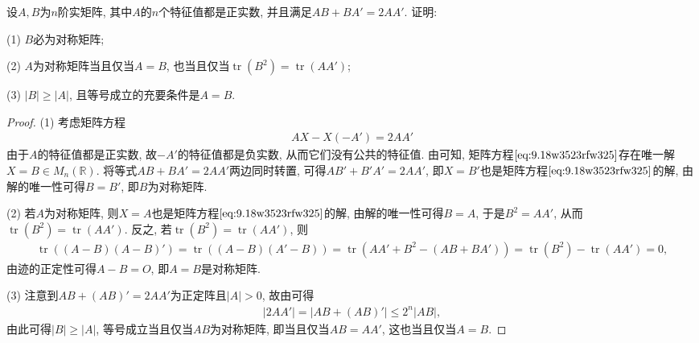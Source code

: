 \documentclass[../../main.tex]{subfiles}%
\begin{document}
\begin{example}
设\( A,B \)为\( n \)阶实矩阵, 其中\( A \)的\( n \)个特征值都是正实数, 并且满足\( AB + BA' = 2AA' \). 证明:

(1) \( B \)必为对称矩阵;

(2) \( A \)为对称矩阵当且仅当\( A = B \), 也当且仅当\( \operatorname{tr}(B^2) = \operatorname{tr}(AA') \);

(3) \( |B| \geqslant |A| \), 且等号成立的充要条件是\( A = B \).
\end{example}
\begin{proof}
(1) 考虑矩阵方程
\begin{align}\label{eq:9.18w3523rfw325}
AX - X(-A') = 2AA'
\end{align}
由于\( A \)的特征值都是正实数, 故\( -A' \)的特征值都是负实数, 从而它们没有公共的特征值. 由可知, 矩阵方程\(\eqref{eq:9.18w3523rfw325}\)存在唯一解\( X = B \in M_n(\mathbb{R}) \). 将等式\( AB + BA' = 2AA' \)两边同时转置, 可得\( AB' + B'A' = 2AA' \), 即\( X = B' \)也是矩阵方程\(\eqref{eq:9.18w3523rfw325}\)的解, 由解的唯一性可得\( B = B' \), 即\( B \)为对称矩阵.

(2) 若\( A \)为对称矩阵, 则\( X = A \)也是矩阵方程\(\eqref{eq:9.18w3523rfw325}\)的解, 由解的唯一性可得\( B = A \), 于是\( B^2 = AA' \), 从而\( \operatorname{tr}(B^2) = \operatorname{tr}(AA') \). 反之, 若\( \operatorname{tr}(B^2) = \operatorname{tr}(AA') \), 则
\begin{align*}
\operatorname{tr}\left((A - B)(A - B)'\right) = \operatorname{tr}\left((A - B)(A' - B)\right) = \operatorname{tr}\left(AA' + B^2 - (AB + BA')\right) = \operatorname{tr}(B^2) - \operatorname{tr}(AA') = 0,
\end{align*}
由迹的正定性可得\( A - B = O \), 即\( A = B \)是对称矩阵.

(3) 注意到\( AB + (AB)' = 2AA' \)为正定阵且\( |A| > 0 \), 故由可得
\begin{align*}
|2AA' |=\left| AB+(AB)' \right|\leqslant 2^n|AB|, 
\end{align*}
由此可得\( |B| \geqslant |A| \), 等号成立当且仅当\( AB \)为对称矩阵, 即当且仅当\( AB = AA' \), 这也当且仅当\( A = B \). 
\end{proof}
\end{document}
